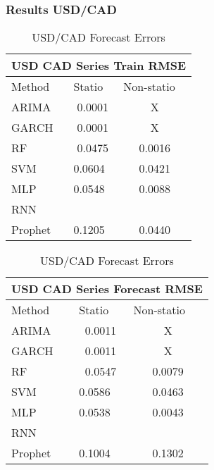 \documentclass{beamer}
\begin{document}
	\begin{frame}
	\frametitle{Results USD/CAD}	
	\begin{table}
		\parbox{.45\linewidth}{
			\centering
			\begin{tabular}{|lll|}
				\hline
				\multicolumn{3}{|c|}{USD CAD Series Train RMSE}                                                  \\ \hline
				\multicolumn{1}{|l|}{Method}  & \multicolumn{1}{l|}{Statio} & Non-statio             \\ \hline
				\multicolumn{1}{|l|}{ARIMA}   & \multicolumn{1}{c|}{0.0001}       & \multicolumn{1}{c|}{X} \\ \hline
				\multicolumn{1}{|l|}{GARCH}   & \multicolumn{1}{c|}{0.0001}       & \multicolumn{1}{c|}{X} \\ \hline
				\multicolumn{1}{|l|}{RF}      & \multicolumn{1}{c|}{0.0475}       & \multicolumn{1}{c|}{0.0016}  \\ \hline
				\multicolumn{1}{|l|}{SVM}     & \multicolumn{1}{l|}{0.0604}       & \multicolumn{1}{c|}{0.0421}  \\ \hline
				\multicolumn{1}{|l|}{MLP}     & \multicolumn{1}{l|}{0.0548}       & \multicolumn{1}{c|}{0.0088}  \\ \hline
				\multicolumn{1}{|l|}{RNN}     & \multicolumn{1}{l|}{}       & \multicolumn{1}{c|}{}  \\ \hline
				\multicolumn{1}{|l|}{Prophet} & \multicolumn{1}{l|}{0.1205}       & \multicolumn{1}{c|}{0.0440}  \\ \hline
			\end{tabular}
			\caption{USD/CAD Train Errors}
		}
		\hfill
		\parbox{.45\linewidth}{
			\centering
		\begin{tabular}{|lll|}
			\hline
			\multicolumn{3}{|c|}{USD CAD Series Forecast RMSE}                                                  \\ \hline
			\multicolumn{1}{|l|}{Method}  & \multicolumn{1}{l|}{Statio} & Non-statio             \\ \hline
			\multicolumn{1}{|l|}{ARIMA}   & \multicolumn{1}{c|}{0.0011}       & \multicolumn{1}{c|}{X} \\ \hline
			\multicolumn{1}{|l|}{GARCH}   & \multicolumn{1}{c|}{0.0011}       & \multicolumn{1}{c|}{X} \\ \hline
			\multicolumn{1}{|l|}{RF}      & \multicolumn{1}{c|}{0.0547}       & \multicolumn{1}{c|}{0.0079}  \\ \hline
			\multicolumn{1}{|l|}{SVM}     & \multicolumn{1}{l|}{0.0586}       & \multicolumn{1}{c|}{0.0463}  \\ \hline
			\multicolumn{1}{|l|}{MLP}     & \multicolumn{1}{l|}{0.0538}       & \multicolumn{1}{c|}{0.0043}  \\ \hline
			\multicolumn{1}{|l|}{RNN}     & \multicolumn{1}{l|}{}       & \multicolumn{1}{c|}{}  \\ \hline
			\multicolumn{1}{|l|}{Prophet} & \multicolumn{1}{l|}{0.1004}       & \multicolumn{1}{c|}{0.1302}  \\ \hline
		\end{tabular}
			\caption{USD/CAD Forecast Errors}
		}
	\end{table}
	

\end{frame}
\end{document}
